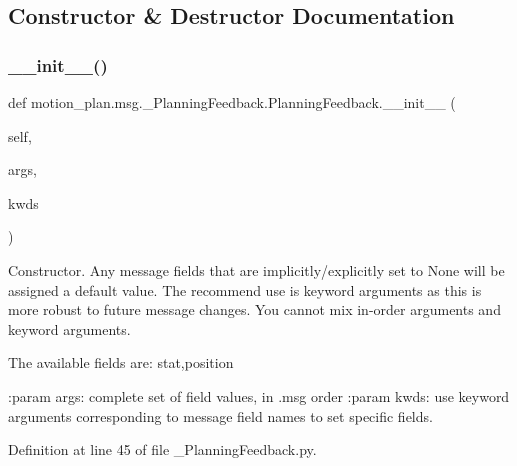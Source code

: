 \subsection{Constructor \& Destructor Documentation}
\mbox{\label{classmotion__plan_1_1msg_1_1__PlanningFeedback_1_1PlanningFeedback_aeb180207cfd88660246b8ed325ebf834}} 
\subsubsection{\texorpdfstring{\+\_\+\+\_\+init\+\_\+\+\_\+()}{\_\_init\_\_()}}
{\footnotesize\ttfamily def motion\+\_\+plan.\+msg.\+\_\+\+Planning\+Feedback.\+Planning\+Feedback.\+\_\+\+\_\+init\+\_\+\+\_\+ (\begin{DoxyParamCaption}\item[{}]{self,  }\item[{}]{args,  }\item[{}]{kwds }\end{DoxyParamCaption})}

\begin{DoxyVerb}Constructor. Any message fields that are implicitly/explicitly
set to None will be assigned a default value. The recommend
use is keyword arguments as this is more robust to future message
changes.  You cannot mix in-order arguments and keyword arguments.

The available fields are:
   stat,position

:param args: complete set of field values, in .msg order
:param kwds: use keyword arguments corresponding to message field names
to set specific fields.
\end{DoxyVerb}
 

Definition at line 45 of file \+\_\+\+Planning\+Feedback.\+py.


